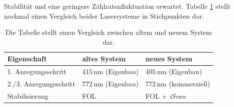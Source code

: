 Stabilität und eine geringere Zählratenfluktuation erwartet. Tabelle
\ref{tab:vergleich_alt_neu} stellt nochmal einen Vergleich beider Lasersysteme
in Stichpunkten dar.
\begin{table}
	\begin{tabular}{p{}|p{}p{}}
		\toprule
		Eigenschaft & altes System & neues System\\
		\midrule[1px]
		\hline
		1. Anregungsschritt & $415\,$nm (Eigenbau) & $405\,$nm (Eigenbau)\\
		2./3. Anregungsschritt & $772\,$nm (Eigenbau) & $772\,$nm (kommerziell)\\
		Stabilisierung & FOL & FOL +
		\textit{iScan}\\
		\bottomrule[1px]
	\end{tabular}
	\caption[Vergleich von altem und
	neuem Lasersystem]{Die Tabelle stellt einen Vergleich zwischen altem und neuem
	System dar.}
	\label{tab:vergleich_alt_neu}
\end{table}
